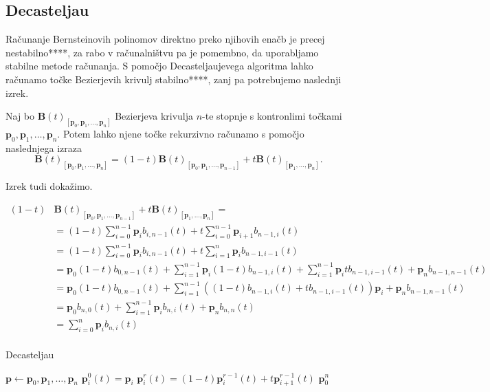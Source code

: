\documentclass[isrm2, tisk]{fmfdelo}
\newcommand{\p}{\textbf{p}}
\newcommand{\lilb}[2]{b_{#1,#2}(t)}
\newcommand{\bigbbt}{\textbf{B}(t)}
\newcommand{\bernsteinsump}[2]{\sum_{#1=0}^{#2} \p_{#1}\lilb{#1}{#2}}
\begin{document}
    \subsection{Decasteljau}
    Računanje Bernsteinovih polinomov direktno preko njihovih enačb je precej nestabilno****, za rabo v računalništvu pa je pomembno, da uporabljamo stabilne metode računanja.
    S pomočjo Decasteljaujevega algoritma lahko računamo točke Bezierjevih krivulj stabilno****, zanj pa potrebujemo naslednji izrek.

    \begin{izrek}
        Naj bo $\bigbbt_{[\p_0,\p_1,\dots,\p_n]}$ Bezierjeva krivulja $n$-te stopnje s kontronlimi točkami $\p_0,\p_1,\dots,\p_n$.
        Potem lahko njene točke rekurzivno računamo s pomočjo naslednjega izraza \[\bigbbt_{[\p_0,\p_1,\dots,\p_n]} = (1-t)\bigbbt_{[\p_0,\p_1,\dots,\p_{n-1}]} +t\bigbbt_{[\p_1,\dots,\p_n]}.\]
    \end{izrek}

    Izrek tudi dokažimo.

    \begin{dokaz}
        \begin{align*}
        (1-t)
            &
            \bigbbt_{[\p_0,\p_1,\dots,\p_{n-1}]}+t\bigbbt_{[\p_1,\dots,\p_n]} = \\
            &= (1-t)\bernsteinsump{i}{n-1}+t\sum_{i=0}^{n-1} \p_{i+1}\lilb{n-1}{i} \\
            &= (1-t)\bernsteinsump{i}{n-1}+ t\sum_{i=1}^{n} \p_{i}\lilb{n-1}{i-1} \\
            &= \p_0(1-t)\lilb{0}{n-1} + \sum_{i=1}^{n-1}\p_{i}(1-t)\lilb{n-1}{i} +  \sum_{i=1}^{n-1} \p_{i}t\lilb{n-1}{i-1} + \p_n \lilb{n-1}{n-1} \\
            &= \p_0(1-t)\lilb{0}{n-1} + \sum_{i=1}^{n-1}\left((1-t)\lilb{n-1}{i} + t\lilb{n-1}{i-1}\right)\p_{i} + \p_n \lilb{n-1}{n-1} \\
            &= \p_0\lilb{n}{0} + \sum_{i=1}^{n-1}\p_{i}\lilb{n}{i} + \p_n \lilb{n}{n} \\
            &= \sum_{i=0}^{n}\p_{i}\lilb{n}{i} \\
        \end{align*}
    \end{dokaz}
    \begin{algorithm}
        \caption{Decasteljau}
        \begin{algorithmic}
            \State $\p \gets \p_0,\p_1,\dots,\p_n$
                \State $\p_i^0(t)=\p_i$
            \EndFor
                    \State $\p_i^r(t)=(1-t)\p_i^{r-1}(t)+t\p_{i+1}^{r-1}(t)$
                \EndFor
            \EndFor
            \State \Return $\p_0^n$
        \end{algorithmic}
    \end{algorithm}
\end{document}

